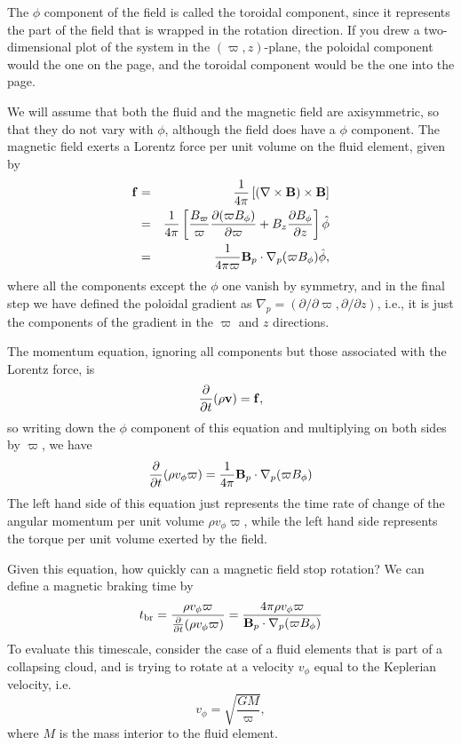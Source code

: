 The $\phi$ component of the field is called the toroidal component, since it represents the part of the field that is wrapped in the rotation direction. If you drew a two-dimensional plot of the system in the $(\varpi, z)$-plane, the poloidal component would the one on the page, and the toroidal component would be the one into the page.

We will assume that both the fluid and the magnetic field are axisymmetric, so that they do not vary with $\phi$, although the field does have a $\phi$ component. The magnetic field exerts a Lorentz force per unit volume on the fluid element, given by
\begin{eqnarray}
\mathbf{f} & = & \frac{1}{4\pi} \left[(\nabla\times\mathbf{B})\times \mathbf{B}\right] \\
& = & \frac{1}{4\pi} \left[\frac{B_\varpi}{\varpi} \frac{\partial(\varpi B_\phi)}{\partial \varpi} + B_z  \frac{\partial B_\phi}{\partial z}\right] \hat{\phi}\\
& = & \frac{1}{4\pi\varpi} \mathbf{B}_p \cdot \nabla_p (\varpi B_{\phi}) \hat{\phi},
\end{eqnarray}
where all the components except the $\phi$ one vanish by symmetry, and in the final step we have defined the poloidal gradient as $\nabla_p = (\partial/\partial\varpi, \partial/\partial z)$, i.e., it is just the components of the gradient in the $\varpi$ and $z$ directions.

The momentum equation, ignoring all components but those associated with the Lorentz force, is
\begin{equation}
\frac{\partial}{\partial t}(\rho \mathbf{v}) = \mathbf{f},
\end{equation}
so writing down the $\phi$ component of this equation and multiplying on both sides by $\varpi$, we have
\begin{equation}
\frac{\partial}{\partial t} (\rho v_{\phi} \varpi) = \frac{1}{4\pi} \mathbf{B}_p\cdot\nabla_p(\varpi B_\phi)
\end{equation}
The left hand side of this equation just represents the time rate of change of the angular momentum per unit volume $\rho v_{\phi} \varpi$, while the left hand side represents the torque per unit volume exerted by the field.

Given this equation, how quickly can a magnetic field stop rotation? We can define a magnetic braking time by
\begin{equation}
t_{\rm br} = \frac{\rho v_{\phi} \varpi}{\frac{\partial}{\partial t} (\rho v_{\phi} \varpi)}
= \frac{4 \pi \rho v_{\phi} \varpi}{\mathbf{B}_p \cdot\nabla_p (\varpi B_\phi)}
\end{equation}
To evaluate this timescale, consider the case of a fluid elements that is part of a collapsing cloud, and is trying to rotate at a velocity $v_{\phi}$ equal to the Keplerian velocity, i.e.
\begin{equation}
v_{\phi} = \sqrt{\frac{GM}{\varpi}},
\end{equation}
where $M$ is the mass interior to the fluid element.

